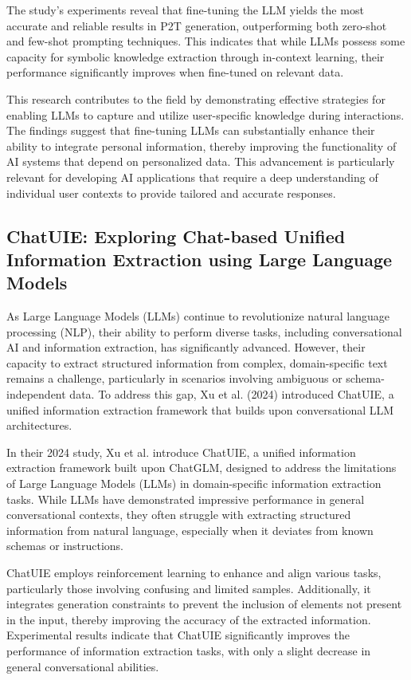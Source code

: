 The study's experiments reveal that fine-tuning the LLM yields the most accurate and reliable results in P2T generation, outperforming both zero-shot and few-shot prompting techniques. This indicates that while LLMs possess some capacity for symbolic knowledge extraction through in-context learning, their performance significantly improves when fine-tuned on relevant data.

This research contributes to the field by demonstrating effective strategies for enabling LLMs to capture and utilize user-specific knowledge during interactions. The findings suggest that fine-tuning LLMs can substantially enhance their ability to integrate personal information, thereby improving the functionality of AI systems that depend on personalized data. This advancement is particularly relevant for developing AI applications that require a deep understanding of individual user contexts to provide tailored and accurate responses.

\subsection{ChatUIE: Exploring Chat-based Unified Information Extraction using Large Language Models}

As Large Language Models (LLMs) continue to revolutionize natural language processing (NLP), their ability to perform diverse tasks, including conversational AI and information extraction, has significantly advanced. However, their capacity to extract structured information from complex, domain-specific text remains a challenge, particularly in scenarios involving ambiguous or schema-independent data. To address this gap, Xu et al. (2024) introduced ChatUIE, a unified information extraction framework that builds upon conversational LLM architectures.

In their 2024 study, Xu et al. introduce ChatUIE, a unified information extraction framework built upon ChatGLM, designed to address the limitations of Large Language Models (LLMs) in domain-specific information extraction tasks. While LLMs have demonstrated impressive performance in general conversational contexts, they often struggle with extracting structured information from natural language, especially when it deviates from known schemas or instructions.

ChatUIE employs reinforcement learning to enhance and align various tasks, particularly those involving confusing and limited samples. Additionally, it integrates generation constraints to prevent the inclusion of elements not present in the input, thereby improving the accuracy of the extracted information. Experimental results indicate that ChatUIE significantly improves the performance of information extraction tasks, with only a slight decrease in general conversational abilities.

